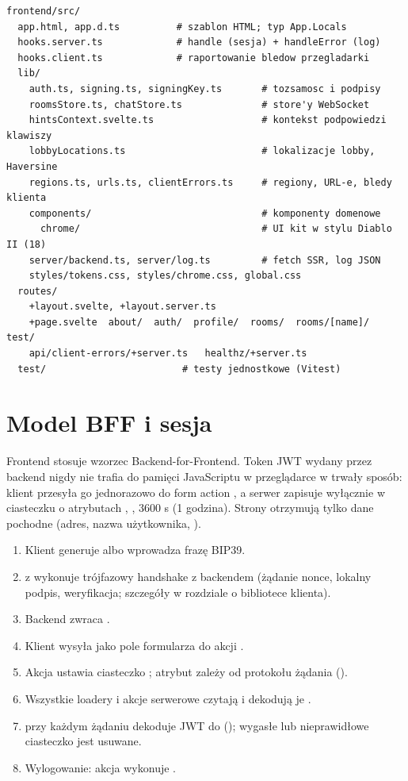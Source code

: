 \begin{lstlisting}
frontend/src/
  app.html, app.d.ts          # szablon HTML; typ App.Locals
  hooks.server.ts             # handle (sesja) + handleError (log)
  hooks.client.ts             # raportowanie bledow przegladarki
  lib/
    auth.ts, signing.ts, signingKey.ts       # tozsamosc i podpisy
    roomsStore.ts, chatStore.ts              # store'y WebSocket
    hintsContext.svelte.ts                   # kontekst podpowiedzi klawiszy
    lobbyLocations.ts                        # lokalizacje lobby, Haversine
    regions.ts, urls.ts, clientErrors.ts     # regiony, URL-e, bledy klienta
    components/                              # komponenty domenowe
      chrome/                                # UI kit w stylu Diablo II (18)
    server/backend.ts, server/log.ts         # fetch SSR, log JSON
    styles/tokens.css, styles/chrome.css, global.css
  routes/
    +layout.svelte, +layout.server.ts
    +page.svelte  about/  auth/  profile/  rooms/  rooms/[name]/  test/
    api/client-errors/+server.ts   healthz/+server.ts
  test/                        # testy jednostkowe (Vitest)
\end{lstlisting}

\section{Model BFF i sesja}\label{sec:fe-bff}

Frontend stosuje wzorzec Backend-for-Frontend. Token JWT wydany przez backend nigdy nie trafia
do pamięci JavaScriptu w przeglądarce w trwały sposób: klient przesyła go jednorazowo do form
action , a serwer zapisuje wyłącznie w ciasteczku  o atrybutach
, ,  3600 s (1 godzina). Strony otrzymują tylko dane
pochodne (adres, nazwa użytkownika, ).

\begin{enumerate}[nosep]
  \item Klient generuje albo wprowadza frazę BIP39.
  \item {} z  wykonuje trójfazowy handshake z backendem
        (żądanie nonce, lokalny podpis, weryfikacja; szczegóły w rozdziale o bibliotece klienta).
  \item Backend zwraca .
  \item Klient wysyła  jako pole formularza do akcji .
  \item Akcja ustawia ciasteczko ; atrybut  zależy od protokołu
        żądania ().
  \item Wszystkie loadery i akcje serwerowe czytają  i dekodują je .
  \item {} przy każdym żądaniu dekoduje JWT do 
        (); wygasłe lub nieprawidłowe ciasteczko jest usuwane.
  \item Wylogowanie: akcja  wykonuje .
\end{enumerate}

